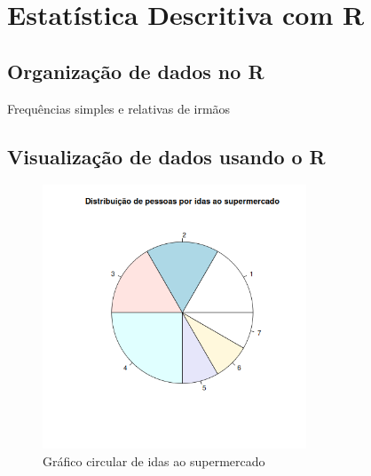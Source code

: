 \documentclass[11pt,a4paper]{report}
\begin{document}
\setcounter{chapter}{2}
\chapter{Estatística Descritiva com R}
\section{Organização de dados no R}



\begin{table}[h!]
	\centering
	\caption{Frequências simples e relativas de irmãos}
	\label{tab:3.1}
\end{table}

\clearpage

\section{Visualização de dados usando o R}

\begin{figure}[h!]
	\centering
	\includegraphics[width=0.7\textwidth]{imagem/ieedr/ex3_2.png}
	\caption{Gráfico circular de idas ao supermercado}
\end{figure}


\clearpage
\end{document}
